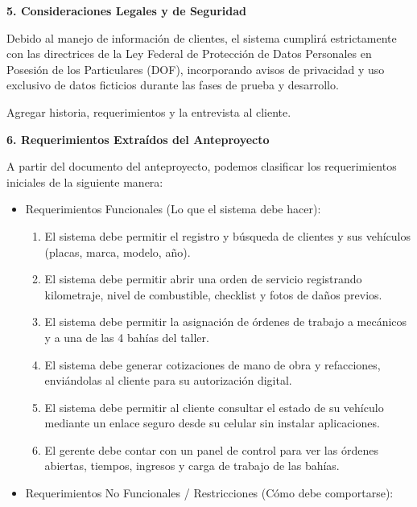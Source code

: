 \documentclass[
  spanish,
  11pt,
  letterpaper,
]{article}
\begin{document}
\textbf{5. Consideraciones Legales y de Seguridad}

Debido al manejo de información de clientes, el sistema cumplirá
estrictamente con las directrices de la Ley Federal de Protección de
Datos Personales en Posesión de los Particulares (DOF), incorporando
avisos de privacidad y uso exclusivo de datos ficticios durante las
fases de prueba y desarrollo.

Agregar historia, requerimientos y la entrevista al cliente.

\textbf{6. Requerimientos Extraídos del Anteproyecto}

A partir del documento del anteproyecto, podemos clasificar los
requerimientos iniciales de la siguiente manera:

\begin{itemize}
\item
  Requerimientos Funcionales (Lo que el sistema debe hacer):

  \begin{enumerate}
  \def\labelenumi{\arabic{enumi}.}
  \item
    El sistema debe permitir el registro y búsqueda de clientes y sus
    vehículos (placas, marca, modelo, año).
  \item
    El sistema debe permitir abrir una orden de servicio registrando
    kilometraje, nivel de combustible, checklist y fotos de daños
    previos.
  \item
    El sistema debe permitir la asignación de órdenes de trabajo a
    mecánicos y a una de las 4 bahías del taller.
  \item
    El sistema debe generar cotizaciones de mano de obra y refacciones,
    enviándolas al cliente para su autorización digital.
  \item
    El sistema debe permitir al cliente consultar el estado de su
    vehículo mediante un enlace seguro desde su celular sin instalar
    aplicaciones.
  \item
    El gerente debe contar con un panel de control para ver las órdenes
    abiertas, tiempos, ingresos y carga de trabajo de las bahías.
  \end{enumerate}
\item
  Requerimientos No Funcionales / Restricciones (Cómo debe comportarse):


\end{itemize}
\end{document}
